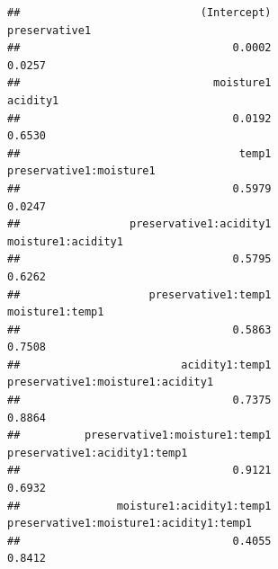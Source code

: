 \documentclass[
]{book}
\begin{document}
\begin{verbatim}
##                            (Intercept)                          preservative1 
##                                 0.0002                                 0.0257 
##                              moisture1                               acidity1 
##                                 0.0192                                 0.6530 
##                                  temp1                preservative1:moisture1 
##                                 0.5979                                 0.0247 
##                 preservative1:acidity1                     moisture1:acidity1 
##                                 0.5795                                 0.6262 
##                    preservative1:temp1                        moisture1:temp1 
##                                 0.5863                                 0.7508 
##                         acidity1:temp1       preservative1:moisture1:acidity1 
##                                 0.7375                                 0.8864 
##          preservative1:moisture1:temp1           preservative1:acidity1:temp1 
##                                 0.9121                                 0.6932 
##               moisture1:acidity1:temp1 preservative1:moisture1:acidity1:temp1 
##                                 0.4055                                 0.8412
\end{verbatim}

  
\end{document}
